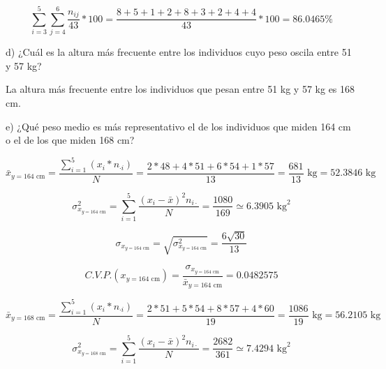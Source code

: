 \documentclass[10pt,a4paper]{article}
\begin{document}
\begin{enumerate}
\begin{equation*}
\displaystyle\sum_{i=3}^{5} \displaystyle\sum_{j=4}^{6} \dfrac{n_{ij}}{43} * 100 = \dfrac{8+5+1+2+8+3+2+4+4}{43} * 100 = 86.0465 \%
\end{equation*}

\vspace{0.5cm}
\hspace{0.25cm} d) ¿Cuál es la altura más frecuente entre los individuos cuyo peso oscila entre 51 y 57 kg?

\vspace{0.5cm}
La altura más frecuente entre los individuos que pesan entre 51 kg y 57 kg es 168 cm.

\vspace{0.5cm}
\hspace{0.25cm} e) ¿Qué peso medio es más representativo el de los individuos que miden 164 cm o el de los que miden 168 cm?

\vspace{0.5cm}
\begin{equation*}
\bar{x}_{y = 164 \textrm{ cm}} = \dfrac{\displaystyle\sum_{i = 1}^5(x_{i}*n_{\cdot i})}{N} = \frac{2*48 + 4*51 + 6*54 + 1*57}{13} = \dfrac{681}{13} \textrm{ kg} = 52.3846 \textrm{ kg} 
\end{equation*}

\begin{equation*}
\sigma_{x_{y = 164 \textrm{ cm}}}^2 = \displaystyle\sum_{i = 1}^5 \dfrac{(x_i - \bar{x})^2 n_{i \cdot}}{N} = \dfrac{1080}{169} \simeq 6.3905 \textrm{ kg}^2
\end{equation*}

\begin{equation*}
\sigma_{x_{y = 164 \textrm{ cm}}} = \sqrt{\sigma_{x_{y = 164 \textrm{ cm}}}^2} = \dfrac{6 \sqrt{30}}{13}
\end{equation*}

\begin{equation*}
C.V.P.(x_{y = 164 \textrm{ cm}}) = \dfrac{\sigma_{x_{y = 164 \textrm{ cm}}}}{\bar{x}_{y = 164 \textrm{ cm}}} = 0.0482575
\end{equation*}

\begin{equation*}
\bar{x}_{y = 168 \textrm{ cm}} = \dfrac{\displaystyle\sum_{i = 1}^5(x_{i}*n_{\cdot i})}{N} = \frac{2*51 + 5*54 + 8*57 + 4*60}{19} = \dfrac{1086}{19} \textrm{ kg} = 56.2105 \textrm{ kg} 
\end{equation*}

\begin{equation*}
\sigma_{x_{y = 168 \textrm{ cm}}}^2 = \displaystyle\sum_{i = 1}^5 \dfrac{(x_i - \bar{x})^2 n_{i \cdot}}{N} = \dfrac{2682}{361} \simeq 7.4294 \textrm{ kg}^2
\end{equation*}


\end{enumerate}
\end{document}
